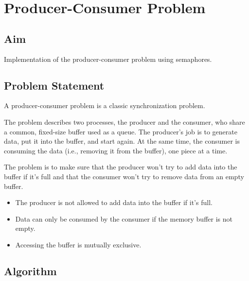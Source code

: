 \section{Producer-Consumer Problem}
\label{sec:producer_consumer}

\subsection{Aim}
Implementation of the producer-consumer problem using semaphores.

\subsection{Problem Statement}

A producer-consumer problem is a classic synchronization problem.

The problem describes two processes, the producer and the consumer, who share a common, fixed-size buffer used as a queue.
The producer's job is to generate data, put it into the buffer, and start again. At the same time, the consumer is consuming the data (i.e., removing it from the buffer), one piece at a time.

The problem is to make sure that the producer won't try to add data into the buffer if it's full and that the consumer won't try to remove data from an empty buffer.

\begin{itemize}
    \item The producer is not allowed to add data into the buffer if it's full.
    \item Data can only be consumed by the consumer if the memory buffer is not empty.
    \item Accessing the buffer is mutually exclusive.
\end{itemize}

\subsection{Algorithm}

